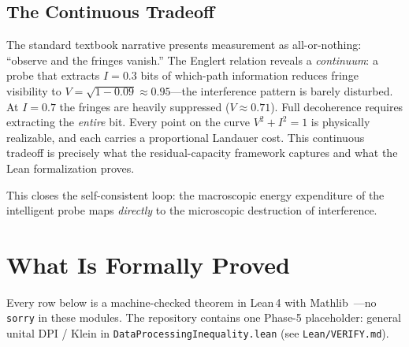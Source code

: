 \documentclass[11pt, a4paper]{article}
\begin{document}
\subsection{The Continuous Tradeoff}

The standard textbook narrative presents measurement as all-or-nothing: ``observe and the fringes vanish.'' The Englert relation reveals a \emph{continuum}: a probe that extracts $I = 0.3$ bits of which-path information reduces fringe visibility to $V = \sqrt{1 - 0.09} \approx 0.95$---the interference pattern is barely disturbed. At $I = 0.7$ the fringes are heavily suppressed ($V \approx 0.71$). Full decoherence requires extracting the \emph{entire} bit. Every point on the curve $V^2 + I^2 = 1$ is physically realizable, and each carries a proportional Landauer cost. This continuous tradeoff is precisely what the residual-capacity framework captures and what the Lean formalization proves.

This closes the self-consistent loop: the macroscopic energy expenditure of the intelligent probe maps \emph{directly} to the microscopic destruction of interference.

\section{What Is Formally Proved}

Every row below is a machine-checked theorem in Lean\,4 with Mathlib~\cite{lean4, mathlib2020}---no \texttt{sorry} in these modules. The repository contains one Phase-5 placeholder: general unital DPI / Klein in \texttt{DataProcessingInequality.lean} (see \texttt{Lean/VERIFY.md}).
\end{document}
